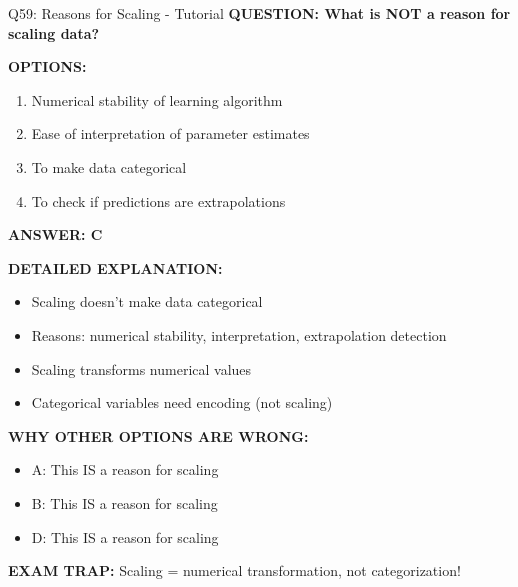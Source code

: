 \documentclass[8pt]{beamer}
\begin{document}
	\begin{frame}{Q59: Reasons for Scaling - Tutorial}
		\fontsize{6.5}{7.5}\selectfont
		\textbf{QUESTION: What is NOT a reason for scaling data?}
		
		\vspace{0.1cm}
		\textbf{OPTIONS:}
		\begin{enumerate}
			\item Numerical stability of learning algorithm
			\item Ease of interpretation of parameter estimates
			\item To make data categorical
			\item To check if predictions are extrapolations
		\end{enumerate}
		
		\vspace{0.1cm}
		\textcolor{myblue}{\textbf{ANSWER: C}}
		
		\vspace{0.1cm}
		\textbf{DETAILED EXPLANATION:}
		\begin{itemize}
			\item Scaling doesn't make data categorical
			\item Reasons: numerical stability, interpretation, extrapolation detection
			\item Scaling transforms numerical values
			\item Categorical variables need encoding (not scaling)
		\end{itemize}
		
		\vspace{0.1cm}
		\textcolor{myred}{\textbf{WHY OTHER OPTIONS ARE WRONG:}}
		\begin{itemize}
			\item \textcolor{myred}{A:} This IS a reason for scaling
			\item \textcolor{myred}{B:} This IS a reason for scaling
			\item \textcolor{myred}{D:} This IS a reason for scaling
		\end{itemize}
		
		\textcolor{myred}{\textbf{EXAM TRAP:}} Scaling = \textcolor{myblue}{numerical transformation, not categorization}!
	\end{frame}
	
\end{document}
